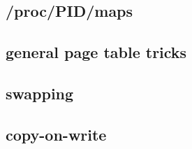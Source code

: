 \subsection{/proc/PID/maps}


\subsection{general page table tricks}


\subsection{swapping}




\subsection{copy-on-write}

